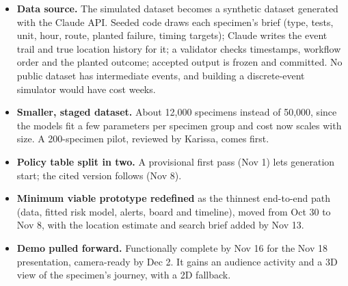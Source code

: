 \documentclass[10pt]{article}
\begin{document}
\begin{itemize}
\item \textbf{Data source.} The simulated dataset becomes a synthetic dataset generated with the Claude API.
  Seeded code draws each specimen's brief (type, tests, unit, hour, route, planted failure, timing targets);
  Claude writes the event trail and true location history for it; a validator checks timestamps, workflow order
  and the planted outcome; accepted output is frozen and committed. No public dataset has intermediate events,
  and building a discrete-event simulator would have cost weeks.
\item \textbf{Smaller, staged dataset.} About 12{,}000 specimens instead of 50{,}000, since the models fit a few
  parameters per specimen group and cost now scales with size. A 200-specimen pilot, reviewed by Karissa, comes first.
\item \textbf{Policy table split in two.} A provisional first pass (Nov 1) lets generation start; the cited
  version follows (Nov 8).
\item \textbf{Minimum viable prototype redefined} as the thinnest end-to-end path (data, fitted risk model,
  alerts, board and timeline), moved from Oct 30 to Nov 8, with the location estimate and search brief added by Nov 13.
\item \textbf{Demo pulled forward.} Functionally complete by Nov 16 for the Nov 18 presentation, camera-ready
  by Dec 2. It gains an audience activity and a 3D view of the specimen's journey, with a 2D fallback.
\end{itemize}
\end{document}
